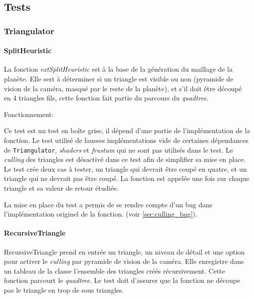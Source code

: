 \subsection{Tests}

\subsubsection{Triangulator}

\paragraph{SplitHeuristic}

La fonction \textit{extSplitHeuristic} est à la base de la génération du maillage de
la planète. Elle sert à déterminer si un triangle est visible ou non
(pyramide de vision de la caméra, masqué par le reste de la planète), et
s'il doit être découpé en 4 triangles fils, cette fonction fait partie
du parcours du \textit{quadtree}.

Fonctionnement:

Ce test est un test en boîte grise, il dépend d'une partie de
l'implémentation de la fonction. Le test utilisé de fausses
implémentations vide de certaines dépendances de \texttt{Triangulator},
\textit{shaders} et \textit{frustum} qui ne sont pas utilisés dans le test. Le \textit{culling} des
triangles est désactivé dans ce test afin de simplifier sa mise en
place. Le test crée deux cas à tester, un triangle qui devrait être
coupé en quatre, et un triangle qui ne devrait pas être coupé. La
fonction est appelée une fois sur chaque triangle et sa valeur de retour
étudiée.

La mise en place du test a permis de se rendre compte d'un bug dans
l'implémentation originel de la fonction. (voir \ref{sec:culling_bug}).\\


\paragraph{RecursiveTriangle}\label{recursivetriangle}

RecursiveTriangle prend en entrée un triangle, un niveau de détail et
une option pour activer le \textit{culling} par pyramide de vision de la caméra.
Elle enregistre dans un tableau de la classe l'ensemble des triangles
créés récursivement. Cette fonction parcourt le \emph{quadtree}. Le test
doit d'assurer que la fonction ne découpe pas le triangle en trop de
sous triangles.

